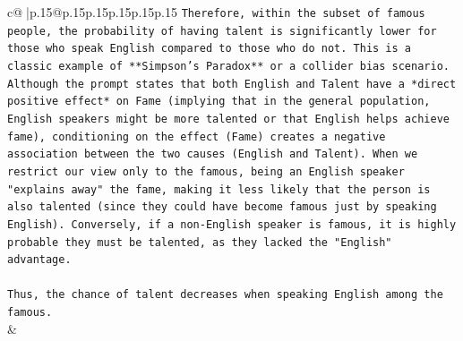 \documentclass{article}
\begin{document}
{\begin{supertabular}{c@{$\;$}|p{.15\linewidth}@{}p{.15\linewidth}p{.15\linewidth}p{.15\linewidth}p{.15\linewidth}p{.15\linewidth}}
{{{\texttt{Therefore, within the subset of famous people, the probability of having talent is significantly lower for those who speak English compared to those who do not. This is a classic example of **Simpson's Paradox** or a collider bias scenario. Although the prompt states that both English and Talent have a *direct positive effect* on Fame (implying that in the general population, English speakers might be more talented or that English helps achieve fame), conditioning on the effect (Fame) creates a negative association between the two causes (English and Talent). When we restrict our view only to the famous, being an English speaker "explains away" the fame, making it less likely that the person is also talented (since they could have become famous just by speaking English). Conversely, if a non{-}English speaker is famous, it is highly probable they must be talented, as they lacked the "English" advantage.} \\
\\ 
\texttt{Thus, the chance of talent decreases when speaking English among the famous.} \\
            }
        }
    }
    & \\ \\


\end{supertabular}}
\end{document}
